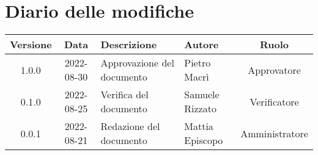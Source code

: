 \section*{Diario delle modifiche}
	\begin{center}
	\renewcommand{\arraystretch}{1.8} %
	\begin{tabular}{ |c|c|m{12em}|m{7em}|c| }
	\hline
	\textbf{Versione} & \textbf{Data} & \textbf{Descrizione} &  \textbf{Autore} &  \textbf{Ruolo} \\ %
	\hline
    1.0.0 & 2022-08-30 & Approvazione del documento & Pietro \newline Macrì & Approvatore\\ 
	\hline
    0.1.0 & 2022-08-25 & Verifica del documento & Samuele \newline Rizzato & Verificatore\\ 
	\hline
    0.0.1 & 2022-08-21 & Redazione del documento & Mattia \newline Episcopo & Amministratore\\ 
	\hline
	\end{tabular}
	\end{center}
	\newpage